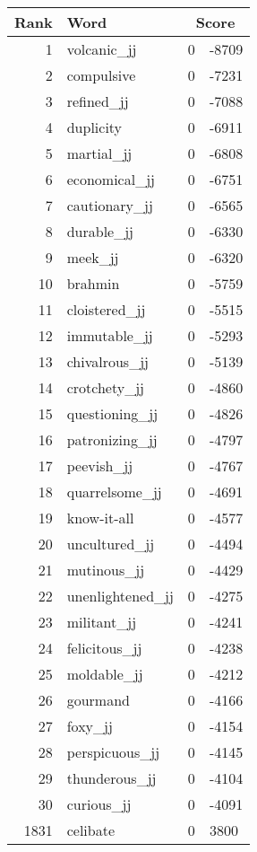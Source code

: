 \begin{longtable}[!htbp]{| rlr@{.}l |}
    \hline
    \textbf{Rank} & \textbf{Word} & \multicolumn{2}{c|}{\textbf{Score}} \\
    \hline
    \endhead
    1 & volcanic\_jj & 0 & -8709 \\
    2 & compulsive & 0 & -7231 \\
    3 & refined\_jj & 0 & -7088 \\
    4 & duplicity & 0 & -6911 \\
    5 & martial\_jj & 0 & -6808 \\
    6 & economical\_jj & 0 & -6751 \\
    7 & cautionary\_jj & 0 & -6565 \\
    8 & durable\_jj & 0 & -6330 \\
    9 & meek\_jj & 0 & -6320 \\
    10 & brahmin & 0 & -5759 \\
    11 & cloistered\_jj & 0 & -5515 \\
    12 & immutable\_jj & 0 & -5293 \\
    13 & chivalrous\_jj & 0 & -5139 \\
    14 & crotchety\_jj & 0 & -4860 \\
    15 & questioning\_jj & 0 & -4826 \\
    16 & patronizing\_jj & 0 & -4797 \\
    17 & peevish\_jj & 0 & -4767 \\
    18 & quarrelsome\_jj & 0 & -4691 \\
    19 & know-it-all & 0 & -4577 \\
    20 & uncultured\_jj & 0 & -4494 \\
    21 & mutinous\_jj & 0 & -4429 \\
    22 & unenlightened\_jj & 0 & -4275 \\
    23 & militant\_jj & 0 & -4241 \\
    24 & felicitous\_jj & 0 & -4238 \\
    25 & moldable\_jj & 0 & -4212 \\
    26 & gourmand & 0 & -4166 \\
    27 & foxy\_jj & 0 & -4154 \\
    28 & perspicuous\_jj & 0 & -4145 \\
    29 & thunderous\_jj & 0 & -4104 \\
    30 & curious\_jj & 0 & -4091 \\
    1831 & celibate & 0 & 3800 \\

\end{longtable}
